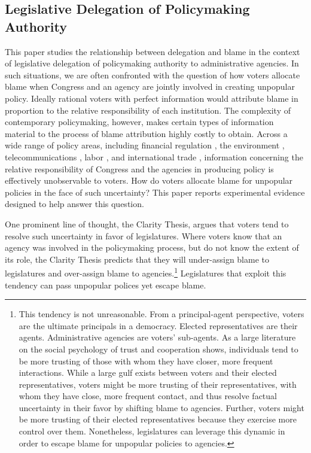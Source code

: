 \documentclass{article}
\begin{document}
\subsection{Legislative Delegation of Policymaking Authority}

This paper studies the relationship between delegation and blame in the context of legislative delegation of policymaking authority to administrative agencies. In such situations, we are often confronted with the question of how voters allocate blame when Congress and an agency are jointly involved in creating unpopular policy. Ideally rational voters with perfect information would attribute blame in proportion to the relative responsibility of each institution. \citep{Cutler2004} The complexity of contemporary policymaking, however, makes certain types of information material to the process of blame attribution highly costly to obtain. \citep{Gersen2010b} Across a wide range of policy areas, including financial regulation \citep{Romano2012}, the environment \citep{Schoenbrod1993}, telecommunications \citep{Arnold1990}, labor \citep{Farber1991}, and international trade \citep{Epstein1999}, information concerning the relative responsibility of Congress and the agencies in producing policy is effectively unobservable to voters. How do voters allocate blame for unpopular policies in the face of such uncertainty? This paper reports experimental evidence designed to help answer this question. 

One prominent line of thought, the Clarity Thesis, argues that voters tend to resolve such uncertainty in favor of legislatures. \citep{Fox2011, Majone1999, Fiorina1982, Nzelibe2010, Gersen2010b, Mesquita.draft} Where voters know that an agency was involved in the policymaking process, but do not know the extent of its role, the Clarity Thesis predicts that they will under-assign blame to legislatures and over-assign blame to agencies.\footnote{This tendency is not unreasonable. From a principal-agent perspective, voters are the ultimate principals in a democracy. Elected representatives are their agents. \citep{Weingast1984} Administrative agencies are voters' sub-agents. As a large literature on the social psychology of trust and cooperation shows, individuals tend to be more trusting of those with whom they have closer, more frequent interactions. \citep{Tyler2010} While a large gulf exists between voters and their elected representatives, voters might be more trusting of their representatives, with whom they have close, more frequent contact, and thus resolve factual uncertainty in their favor by shifting blame to agencies. Further, voters might be more trusting of their elected representatives because they exercise more control over them. \citep{Ferejohn1999} Nonetheless, legislatures can leverage this dynamic in order to escape blame for unpopular policies to agencies.} Legislatures that exploit this tendency can pass unpopular polices yet escape blame. 
\end{document}

